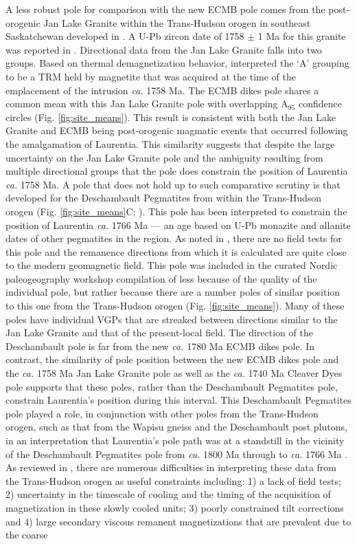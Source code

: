 \documentclass[draft]{agujournal2019}
\begin{document}
 A less robust pole for comparison with the new ECMB pole comes from the post-orogenic Jan Lake Granite within the Trans-Hudson orogen in southeast Saskatchewan developed in . A U-Pb zircon date of 1758 $\pm$ 1 Ma for this granite was reported in . Directional data from the Jan Lake Granite falls into two groups. Based on thermal demagnetization behavior,  interpreted the `A' grouping to be a TRM held by magnetite that was acquired at the time of the emplacement of the intrusion \textit{ca.} 1758 Ma.  The ECMB dikes pole shares a common mean with this Jan Lake Granite pole with overlapping A$_{95}$ confidence circles (Fig. \ref{fig:site_means}). This result is consistent with both the Jan Lake Granite and ECMB being post-orogenic magmatic events that occurred following the amalgamation of Laurentia. This similarity suggests that despite the large uncertainty on the Jan Lake Granite pole and the ambiguity resulting from multiple directional groups that the pole does constrain the position of Laurentia \textit{ca.} 1758 Ma. A pole that does not hold up to such comparative scrutiny is that developed for the Deschambault Pegmatites from within the Trans-Hudson orogen (Fig. \ref{fig:site_means}C; ).  This pole has been interpreted to constrain the position of Laurentia \textit{ca.} 1766 Ma --- an age based on U-Pb monazite and allanite dates of other pegmatites in the region. As noted in , there are no field tests for this pole and the remanence directions from which it is calculated are quite close to the modern geomagnetic field. This pole was included in the curated Nordic paleogeography workshop compilation of   less because of the quality of the individual pole, but rather because there are a number poles of similar position to this one from the Trans-Hudson orogen (Fig. \ref{fig:site_means}). Many of these poles have individual VGPs that are streaked between directions similar to the Jan Lake Granite and that of the present-local field. The direction of the Deschambault pole is far from the new \textit{ca.} 1780 Ma ECMB dikes pole. In contrast, the similarity of pole position between the new ECMB dikes pole and the \textit{ca.} 1758 Ma Jan Lake Granite pole as well as the \textit{ca.} 1740 Ma Cleaver Dyes pole supports that these poles, rather than the Deschambault Pegmatites pole, constrain Laurentia's position during this interval. This Deschambault Pegmatites pole played a role, in conjunction with other poles from the Trans-Hudson orogen, such as that from the Wapisu gneiss and the Deschambault post plutons, in an interpretation that Laurentia's pole path was at a standstill in the vicinity of the Deschambault Pegmatites pole from \textit{ca.} 1800 Ma through to \textit{ca.} 1766 Ma \cite{Symons2000a, Symons2005a}. As reviewed in , there are numerous difficulties in interpreting these data from the Trans-Hudson orogen as useful constraints including: 1) a lack of field tests; 2) uncertainty in the timescale of cooling and the timing of the acquisition of magnetization in these slowly cooled units; 3) poorly constrained tilt corrections and 4) large secondary viscous remanent magnetizations that are prevalent due to the coarse 
\end{document}
